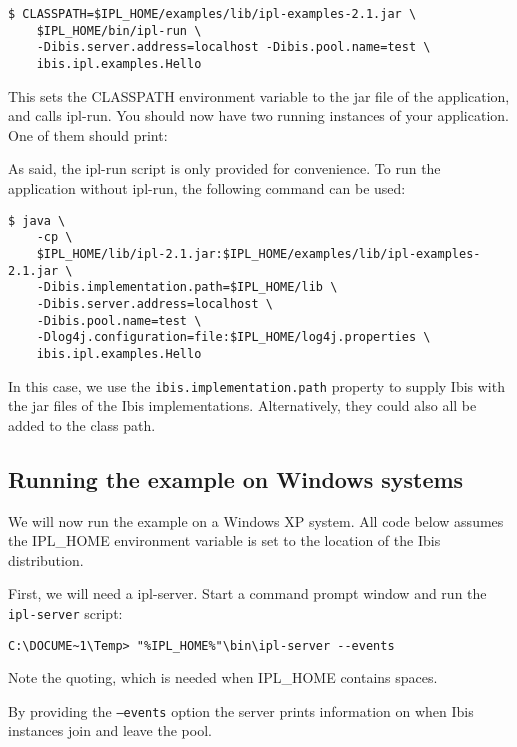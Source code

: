 \documentclass[a4paper,10pt]{article}
\begin{document}
\noindent
{\small
\begin{verbatim}
$ CLASSPATH=$IPL_HOME/examples/lib/ipl-examples-2.1.jar \
    $IPL_HOME/bin/ipl-run \
    -Dibis.server.address=localhost -Dibis.pool.name=test \
    ibis.ipl.examples.Hello
\end{verbatim}
}
\noindent

This sets the CLASSPATH environment variable to the jar file of the
application, and calls ipl-run. You should now have two running
instances of your application. One of them should print:

\noindent {\small \begin{verbatim} Server received: Hi there
\end{verbatim} } \noindent 

As said, the ipl-run script is only provided for convenience. To run
the application without ipl-run, the following command can be used:

\noindent
{\small
\begin{verbatim}
$ java \
    -cp \
    $IPL_HOME/lib/ipl-2.1.jar:$IPL_HOME/examples/lib/ipl-examples-2.1.jar \
    -Dibis.implementation.path=$IPL_HOME/lib \
    -Dibis.server.address=localhost \
    -Dibis.pool.name=test \
    -Dlog4j.configuration=file:$IPL_HOME/log4j.properties \
    ibis.ipl.examples.Hello
\end{verbatim}
}
\noindent

In this case, we use the \texttt{ibis.implementation.path} property to supply Ibis
with the jar files of the Ibis implementations. Alternatively, they
could also all be added to the class path.

\subsection{Running the example on Windows systems}

We will now run the example on a Windows XP system.
All code below assumes the IPL\_HOME
environment variable is set to the location of the Ibis distribution.

First, we will need a ipl-server. Start a command prompt window and
run the \texttt{ipl-server} script:
\noindent
{\small
\begin{verbatim}
C:\DOCUME~1\Temp> "%IPL_HOME%"\bin\ipl-server --events
\end{verbatim}
}
\noindent

Note the quoting, which is needed when IPL\_HOME contains spaces.

By providing the \texttt{--events} option the server 
prints information on when Ibis instances join and leave the pool.
\end{document}

